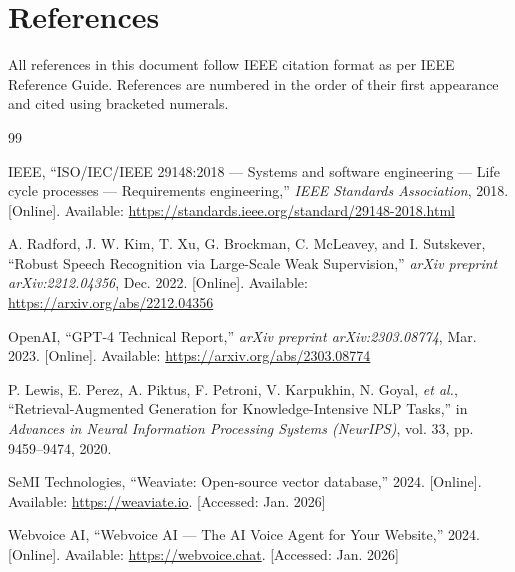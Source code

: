 \chapter*{References}

\vspace{-0.5cm}

\begin{infobox}
All references in this document follow IEEE citation format as per IEEE Reference Guide. References are numbered in the order of their first appearance and cited using bracketed numerals.
\end{infobox}

\vspace{0.5cm}

\begin{thebibliography}{99}

IEEE, ``ISO/IEC/IEEE 29148:2018 --- Systems and software engineering --- Life cycle processes --- Requirements engineering,'' \textit{IEEE Standards Association}, 2018. [Online]. Available: \url{https://standards.ieee.org/standard/29148-2018.html}

A. Radford, J. W. Kim, T. Xu, G. Brockman, C. McLeavey, and I. Sutskever, ``Robust Speech Recognition via Large-Scale Weak Supervision,'' \textit{arXiv preprint arXiv:2212.04356}, Dec. 2022. [Online]. Available: \url{https://arxiv.org/abs/2212.04356}

OpenAI, ``GPT-4 Technical Report,'' \textit{arXiv preprint arXiv:2303.08774}, Mar. 2023. [Online]. Available: \url{https://arxiv.org/abs/2303.08774}

P. Lewis, E. Perez, A. Piktus, F. Petroni, V. Karpukhin, N. Goyal, \textit{et al.}, ``Retrieval-Augmented Generation for Knowledge-Intensive NLP Tasks,'' in \textit{Advances in Neural Information Processing Systems (NeurIPS)}, vol. 33, pp. 9459--9474, 2020.

SeMI Technologies, ``Weaviate: Open-source vector database,'' 2024. [Online]. Available: \url{https://weaviate.io}. [Accessed: Jan. 2026]

Webvoice AI, ``Webvoice AI --- The AI Voice Agent for Your Website,'' 2024. [Online]. Available: \url{https://webvoice.chat}. [Accessed: Jan. 2026]


\end{thebibliography}
